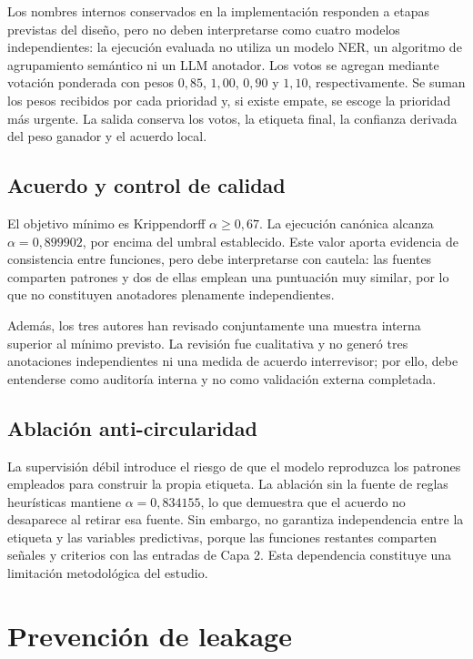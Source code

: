 Los nombres internos conservados en la implementación responden a etapas previstas del diseño, pero no deben interpretarse como cuatro modelos independientes: la ejecución evaluada no utiliza un modelo NER, un algoritmo de agrupamiento semántico ni un LLM anotador. Los votos se agregan mediante votación ponderada con pesos \(0{,}85\), \(1{,}00\), \(0{,}90\) y \(1{,}10\), respectivamente. Se suman los pesos recibidos por cada prioridad y, si existe empate, se escoge la prioridad más urgente. La salida conserva los votos, la etiqueta final, la confianza derivada del peso ganador y el acuerdo local.

\subsection{Acuerdo y control de calidad}

El objetivo mínimo es Krippendorff \(\alpha \geq 0{,}67\). La ejecución canónica alcanza \(\alpha = 0{,}899902\), por encima del umbral establecido. Este valor aporta evidencia de consistencia entre funciones, pero debe interpretarse con cautela: las fuentes comparten patrones y dos de ellas emplean una puntuación muy similar, por lo que no constituyen anotadores plenamente independientes.

Además, los tres autores han revisado conjuntamente una muestra interna superior al mínimo previsto. La revisión fue cualitativa y no generó tres anotaciones independientes ni una medida de acuerdo interrevisor; por ello, debe entenderse como auditoría interna y no como validación externa completada.

\subsection{Ablación anti-circularidad}

La supervisión débil introduce el riesgo de que el modelo reproduzca los patrones empleados para construir la propia etiqueta. La ablación sin la fuente de reglas heurísticas mantiene \(\alpha = 0{,}834155\), lo que demuestra que el acuerdo no desaparece al retirar esa fuente. Sin embargo, no garantiza independencia entre la etiqueta y las variables predictivas, porque las funciones restantes comparten señales y criterios con las entradas de Capa 2. Esta dependencia constituye una limitación metodológica del estudio.

\section{Prevención de leakage}

